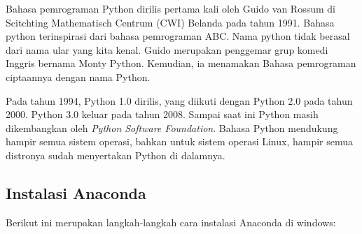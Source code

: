Bahasa pemrograman Python dirilis pertama kali oleh Guido van Rossum di Scitchting Mathematisch Centrum (CWI) Belanda pada tahun 1991. Bahasa python terinspirasi dari bahasa pemrograman ABC. Nama python tidak berasal dari nama ular yang kita kenal. Guido merupakan penggemar grup komedi Inggris bernama Monty Python. Kemudian, ia menamakan Bahasa pemrograman ciptaannya dengan nama Python.

Pada tahun 1994, Python 1.0 dirilis, yang diikuti dengan Python 2.0 pada tahun 2000. Python 3.0 keluar pada tahun 2008. Sampai saat ini Python masih dikembangkan oleh \textit{Python Software Foundation}. Bahasa Python mendukung hampir semua sistem operasi, bahkan untuk sistem operasi Linux, hampir semua distronya sudah menyertakan Python di dalamnya.


\subsection{Instalasi Anaconda}
Berikut ini merupakan langkah-langkah cara instalasi Anaconda di windows:
